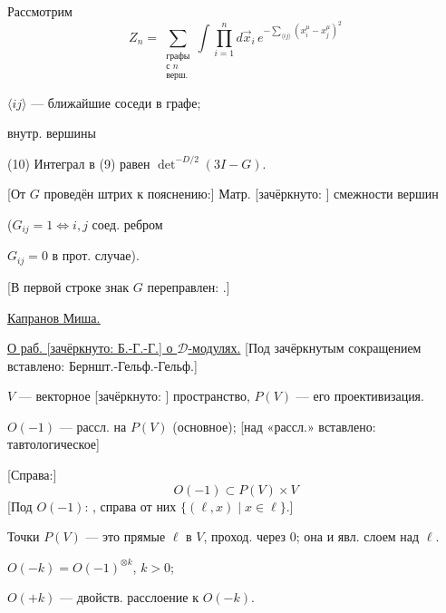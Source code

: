 

Рассмотрим
\begin{equation*}
Z_n=\sum_{\substack{\text{графы}\\ \text{с }n\\ \text{верш.}}}
\int\prod_{i=1}^{n}d\vec{x}_i\,
e^{-\sum_{\langle ij\rangle}(x_i^{\mu}-x_j^{\mu})^2}
\tag{9}
\end{equation*}

$\langle ij\rangle$ — ближайшие соседи в графе;

внутр. вершины

(10) Интеграл в (9) равен $\det^{-D/2}(3I-G)$.

[От $G$ проведён штрих к пояснению:]
Матр. [зачёркнуто:
]
смежности вершин

($G_{ij}=1\Longleftrightarrow i,j$ соед. ребром

$G_{ij}=0$
в прот. случае).

[В первой строке знак $G$ переправлен:
.]

\underline{\underline{Капранов Миша.}}

\underline{О раб. [зачёркнуто: Б.-Г.-Г.] о $\mathcal{D}$-модулях.}
[Под зачёркнутым сокращением вставлено: Берншт.-Гельф.-Гельф.]

$V$ — векторное [зачёркнуто:
]
пространство, $P(V)$ — его проективизация.

$O(-1)$ — рассл. на $P(V)$ (основное);
[над «рассл.» вставлено: тавтологическое]

[Справа:]
\begin{equation*}
O(-1)\subset P(V)\times V
\end{equation*}
[Под $O(-1)$:
,
справа от них $\{(\ell,x)\mid x\in\ell\}$.]

Точки $P(V)$ — это прямые $\ell$ в $V$, проход. через $0$;
она и явл. слоем над $\ell$.

$O(-k)=O(-1)^{\otimes k}$, $k>0$;

$O(+k)$ — двойств. расслоение к $O(-k)$.

